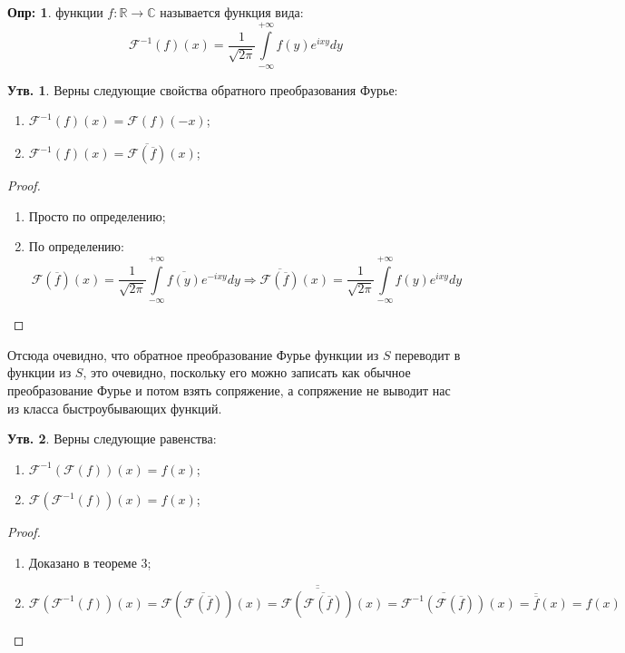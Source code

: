 \documentclass[12pt]{article}
\newcommand{\MR}{\mathbb{R}}
\newcommand{\MC}{\mathbb{C}}
\theoremstyle{definition}
\newtheorem{defn}{Опр:}
\newtheorem{prop}{Утв.}
\newcommand{\ddint}[2]{\displaystyle\int\limits_{#1}^{#2}}
\newcommand{\fourt}[1]{\mathcal{F}\left(#1\right)}
\newcommand{\ifourt}[1]{\mathcal{F}^{-1}\left(#1\right)}
\begin{document}
\begin{defn}
	 функции $f \colon \MR \to \MC$ называется функция вида: 
	$$
		\ifourt{f}(x) =  \dfrac{1}{\sqrt{2\pi}}\ddint{-\infty}{+\infty}f(y)e^{ixy}dy
	$$
\end{defn}
	
\begin{prop}
	Верны следующие свойства обратного преобразования Фурье:
	\begin{enumerate}[label=\arabic*)]
		\item $\ifourt{f}(x) = \fourt{f}(-x)$;
		\item $\ifourt{f}(x) = \overline{\fourt{\overline{f}}}(x)$;
	\end{enumerate}
\end{prop}
\begin{proof}\hfill
	\begin{enumerate}[label=\arabic*)]
		\item Просто по определению;
		\item По определению:
		$$
			\fourt{\overline{f}}(x) = \dfrac{1}{\sqrt{2\pi}}\ddint{-\infty}{+\infty}\overline{f(y)}e^{-ixy}dy \Rightarrow \overline{\fourt{\overline{f}}}(x) = \dfrac{1}{\sqrt{2\pi}}\ddint{-\infty}{+\infty}f(y)e^{ixy}dy
		$$
	\end{enumerate}
\end{proof}
Отсюда очевидно, что обратное преобразование Фурье функции из $S$ переводит в функции из $S$, это очевидно, поскольку его можно записать как обычное преобразование Фурье и потом взять сопряжение, а сопряжение не выводит нас из класса быстроубывающих функций.
\begin{prop}
	Верны следующие равенства:
	\begin{enumerate}[label=\arabic*)]
		\item $\ifourt{\fourt{f}}(x) = f(x)$;
		\item $\fourt{\ifourt{f}}(x) = f(x)$;
	\end{enumerate}
\end{prop}
\begin{proof}\hfill
	\begin{enumerate}[label=\arabic*)]
		\item Доказано в теореме $3$;
		\item $\fourt{\ifourt{f}}(x) = \fourt{ \overline{\fourt{\overline{f}}}}(x) = \overline{\overline{\fourt{ \overline{\fourt{\overline{f}}}}}}(x) = \overline{\ifourt{\fourt{\overline{f}}}}(x) = \overline{\overline{f}}(x) = f(x)$
	\end{enumerate}
\end{proof}
\end{document}
